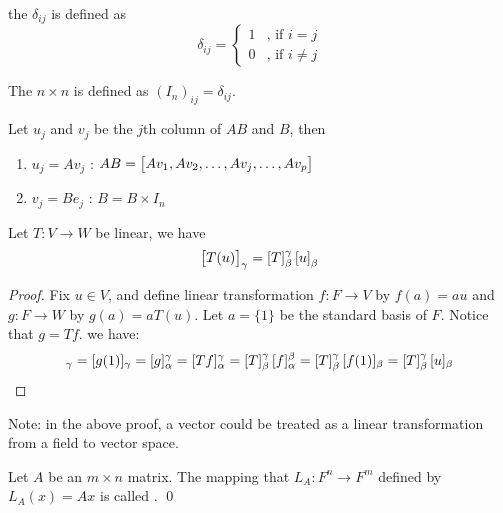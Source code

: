 \begin{definition}
	the   $\delta_{ij}$ is defined as 
	\begin{equation}
		\delta_{ij} = \begin{cases}
			1 & \text{, if } i = j \\
			0 & \text{, if } i \neq j
 		\end{cases}
	\end{equation}
\end{definition}

\begin{definition}
	The $n\times n$   is defined as $\left(I_n \right)_{ij} = \delta_{ij}$.
\end{definition}

\begin{theorem}
	Let $u_j$ and $v_j$ be the $j$th column of $AB$ and $B$, then
	\begin{enumerate}
		\item $u_j = A v_j$ : $AB = \coordinate{A v_1, A v_2, \dots, A v_j, \dots, A v_p}$
		\item $v_j = B e_j$ : $B = B \times I_n$
	\end{enumerate}
\end{theorem}

\begin{theorem} Let $T:V \rightarrow W$ be linear, we have
	\begin{equation}
		\coordinate{T(u)}_\gamma = \coordinate{T}_\beta^\gamma \coordinate{u}_\beta
	\end{equation}
\end{theorem}

\begin{proof}
	Fix $u \in V$, and define linear transformation $f: F \rightarrow V$ by $f(a) = a u$ and $g: F \rightarrow W$ by $g(a) = a T(u)$. Let $a=\{1\}$ be the standard basis of $F$. Notice that $g=Tf$. we have:
	\begin{equation}
		[T(u)]_\gamma = [g(1)]_\gamma = [g]_\alpha^\gamma = [Tf]_\alpha^\gamma = \coordinate{T}_\beta^\gamma [f]_\alpha^\beta = \coordinate{T}_\beta^\gamma [f(1)]_\beta = \coordinate{T}_\beta^\gamma [u]_\beta
	\end{equation}
\end{proof}

Note: in the above proof, a vector could be treated as a linear transformation from a field to vector space.

\begin{definition}
	Let $A$ be an $m \times n$ matrix. The mapping  that $L_A: F^n \rightarrow F^m$ defined by $L_A (x) = A x$ is called  . \qed
\end{definition}


